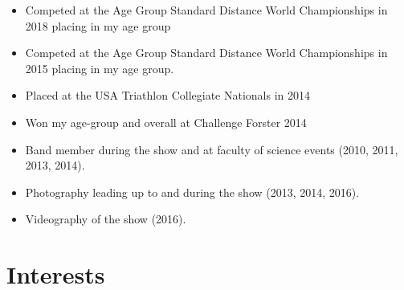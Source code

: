 {%
\begin{itemize}
  \item Competed at the Age Group Standard Distance World Championships in 2018 placing  in my age group
  \item Competed at the Age Group Standard Distance World Championships in 2015 placing  in my age group.
  \item Placed  at the USA Triathlon Collegiate Nationals in 2014
  \item Won my age-group and  overall at Challenge Forster 2014
\end{itemize}
}

{%
\begin{itemize}
  \item Band member during the show and at faculty of science events (2010, 2011, 2013, 2014).
  \item Photography leading up to and during the show (2013, 2014, 2016).
  \item Videography of the show (2016).
\end{itemize}
}



\section{Interests}

\vspace{2em}


